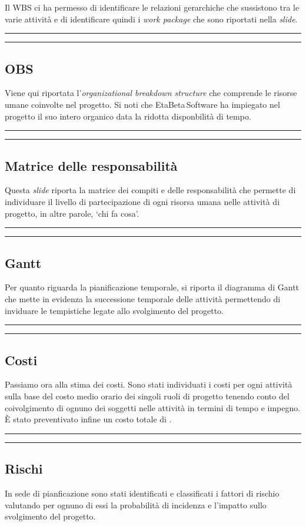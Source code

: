 \documentclass[a4paper,10pt]{article}
\newcommand{\inglese}[1]{\foreignlanguage{english}{\textit{#1}}}
\newcommand{\team}{\textsf{EtaBeta\,Software}\xspace}
\newcommand{\cambioslide}{%
\begin{center}
\Large
\rule[4pt]{0.2\linewidth}{.7pt} \ding{167} \rule[4pt]{0.2\linewidth}{.7pt}
\end{center}
}
\begin{document}
Il WBS ci ha permesso di identificare le relazioni gerarchiche che sussistono tra le varie attività e di identificare quindi i \inglese{work package} che sono riportati nella \inglese{slide}.

\cambioslide

\subsection{OBS}
Viene qui riportata l'\inglese{organizational breakdown structure} che comprende le risorse umane coinvolte nel progetto. Si noti che \team ha impiegato nel progetto il suo intero organico data la ridotta disponbilità di tempo.

\cambioslide

\subsection{Matrice delle responsabilità}
Questa \inglese{slide} riporta la matrice dei compiti e delle responsabilità che permette di individuare il livello di partecipazione di ogni risorsa umana nelle attività di progetto, in altre parole, `chi fa cosa'.

\cambioslide

\subsection{Gantt}
Per quanto riguarda la pianificazione temporale, si riporta il diagramma di Gantt che mette in evidenza la successione temporale delle attività permettendo di inviduare le tempistiche legate allo svolgimento del progetto.

\cambioslide

\subsection{Costi}
Passiamo ora alla stima dei costi. Sono stati individuati i costi per ogni attività sulla base del costo medio orario dei singoli ruoli di progetto tenendo conto del coivolgimento di ognuno dei soggetti nelle attività in termini di tempo e impegno. È stato preventivato infine un costo totale di .

\cambioslide

\subsection{Rischi}
In sede di pianficazione sono stati identificati e classificati i fattori di rischio valutando per ognuno di essi la probabilità di incidenza e l'impatto sullo svolgimento del progetto.
\end{document}
